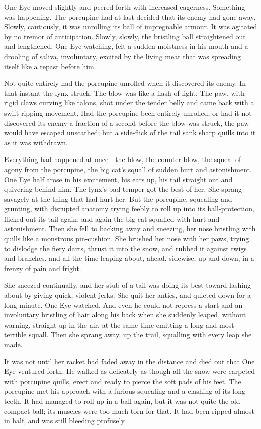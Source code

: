 \documentclass[10pt]{book}
\begin{document}
One Eye moved slightly and peered forth with increased eagerness.
Something was happening. The porcupine had at last decided that its
enemy had gone away. Slowly, cautiously, it was unrolling its ball of
impregnable armour. It was agitated by no tremor of anticipation.
Slowly, slowly, the bristling ball straightened out and lengthened. One
Eye watching, felt a sudden moistness in his mouth and a drooling of
saliva, involuntary, excited by the living meat that was spreading
itself like a repast before him.

Not quite entirely had the porcupine unrolled when it discovered its
enemy. In that instant the lynx struck. The blow was like a flash of
light. The paw, with rigid claws curving like talons, shot under the
tender belly and came back with a swift ripping movement. Had the
porcupine been entirely unrolled, or had it not discovered its enemy a
fraction of a second before the blow was struck, the paw would have
escaped unscathed; but a side-flick of the tail sank sharp quills into
it as it was withdrawn.

Everything had happened at once—the blow, the counter-blow, the squeal
of agony from the porcupine, the big cat’s squall of sudden hurt and
astonishment. One Eye half arose in his excitement, his ears up, his
tail straight out and quivering behind him. The lynx’s bad temper got
the best of her. She sprang savagely at the thing that had hurt her.
But the porcupine, squealing and grunting, with disrupted anatomy
trying feebly to roll up into its ball-protection, flicked out its tail
again, and again the big cat squalled with hurt and astonishment. Then
she fell to backing away and sneezing, her nose bristling with quills
like a monstrous pin-cushion. She brushed her nose with her paws,
trying to dislodge the fiery darts, thrust it into the snow, and rubbed
it against twigs and branches, and all the time leaping about, ahead,
sidewise, up and down, in a frenzy of pain and fright.

She sneezed continually, and her stub of a tail was doing its best
toward lashing about by giving quick, violent jerks. She quit her
antics, and quieted down for a long minute. One Eye watched. And even
he could not repress a start and an involuntary bristling of hair along
his back when she suddenly leaped, without warning, straight up in the
air, at the same time emitting a long and most terrible squall. Then
she sprang away, up the trail, squalling with every leap she made.

It was not until her racket had faded away in the distance and died out
that One Eye ventured forth. He walked as delicately as though all the
snow were carpeted with porcupine quills, erect and ready to pierce the
soft pads of his feet. The porcupine met his approach with a furious
squealing and a clashing of its long teeth. It had managed to roll up
in a ball again, but it was not quite the old compact ball; its muscles
were too much torn for that. It had been ripped almost in half, and was
still bleeding profusely.
\end{document}
